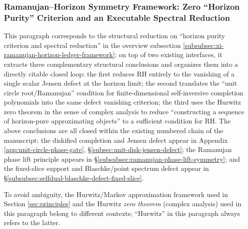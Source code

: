 \subsubsection{Ramanujan--Horizon Symmetry Framework: Zero ``Horizon Purity'' Criterion and an Executable Spectral Reduction}\label{subsubsec:xi-ramanujan-horizon-purity-spectral-reduction}
This paragraph corresponds to the structural reduction on ``horizon purity criterion and spectral reduction'' in the overview subsection \ref{subsubsec:xi-ramanujan-horizon-ledger-framework}: on top of two existing interfaces, it extracts three complementary structural conclusions and organizes them into a directly citable closed loop: the first reduces RH entirely to the vanishing of a single scalar Jensen defect at the horizon limit; the second translates the ``unit circle root/Ramanujan'' condition for finite-dimensional self-inversive completion polynomials into the same defect vanishing criterion; the third uses the Hurwitz zero theorem in the sense of complex analysis to reduce ``constructing a sequence of horizon-pure approximating objects'' to a sufficient condition for RH. The above conclusions are all closed within the existing numbered chain of the manuscript: the diskified completion and Jensen defect appear in Appendix \ref{app:unit-circle-phase-gate}, \S\ref{subsec:unit-disk-jensen-defect}; the Ramanujan phase lift principle appears in \S\ref{subsubsec:ramanujan-phase-lift-symmetry}; and the fixed-slice support and Blaschke/point spectrum defect appear in \S\ref{subsubsec:selfdual-blaschke-defect-fixed-slice}.
\par
To avoid ambiguity, the Hurwitz/Markov approximation framework used in Section \ref{sec:principles} and the Hurwitz \emph{zero theorem} (complex analysis) used in this paragraph belong to different contexts; ``Hurwitz'' in this paragraph always refers to the latter.

